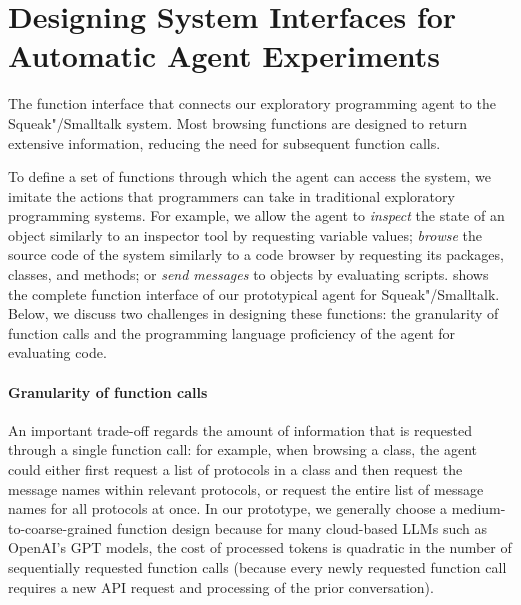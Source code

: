 
\section{Designing System Interfaces for Automatic Agent Experiments}
\label{sec:agent/interfaces}

\begin{table}
	\centering
	\footnotesize
	\caption[The function interface that connects our exploratory programming agent to the Squeak"/Smalltalk system.]{
		The function interface that connects our exploratory programming agent to the Squeak"/Smalltalk system.
		Most browsing functions are designed to return extensive information, reducing the need for subsequent function calls.
	}
	\label{tab:agent/functions/interface}
\end{table}

To define a set of functions through which the agent can access the system, we imitate the actions that programmers can take in traditional exploratory programming systems.
For example, we allow the agent to \emph{inspect} the state of an object similarly to an inspector tool by requesting variable values; \emph{browse} the source code of the system similarly to a code browser by requesting its packages, classes, and methods; or \emph{send messages} to objects by evaluating scripts.
 shows the complete function interface of our prototypical agent for Squeak"/Smalltalk.
Below, we discuss two challenges in designing these functions: the granularity of function calls and the programming language proficiency of the agent for evaluating code.

\paragraph{Granularity of function calls}
An important trade-off regards the amount of information that is requested through a single function call:
for example, when browsing a class, the agent could either first request a list of protocols in a class and then request the message names within relevant protocols, or request the entire list of message names for all protocols at once.
In our prototype, we generally choose a medium-to-coarse-grained function design because for many cloud-based LLMs such as OpenAI's GPT models, the cost of processed tokens is quadratic in the number of sequentially requested function calls (because every newly requested function call requires a new API request and processing of the prior conversation).

